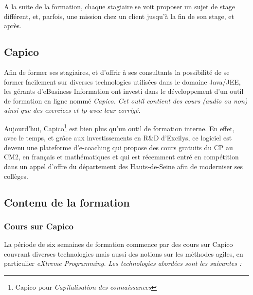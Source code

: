 A la suite de la formation, chaque stagiaire se voit proposer un sujet de stage différent, et, parfois, une mission chez un client jusqu'à la fin de son stage, et après. 

\subsection{Capico}

Afin de former ses stagiaires, et d'offrir à ses consultants la possibilité de se former facilement sur diverses technologies utilisées dans le domaine Java/JEE, les gérants d'eBusiness Information ont investi dans le développement d'un outil de formation en ligne nommé \em{Capico}. Cet outil contient des cours (audio ou non) ainsi que des exercices et tp avec leur corrigé.

Aujourd'hui, Capico\footnote{Capico pour \em{Capi}talisation des \em{co}nnaissances} est bien plus qu'un outil de formation interne. En effet, avec le temps, et grâce aux investissements en R\&D d'Excilys, ce logiciel est devenu une plateforme d'e-coaching qui propose des cours gratuits du CP au CM2, en français et mathématiques et qui est récemment entré en compétition dans un appel d'offre du département des Hauts-de-Seine afin de moderniser ses collèges.  

\subsection{Contenu de la formation}

\subsubsection{Cours sur Capico}
La période de six semaines de formation commence par des cours sur Capico couvrant diverses technologies mais aussi des notions sur les méthodes agiles, en particulier \em{eXtreme Programming}. Les technologies abordées sont les suivantes :

